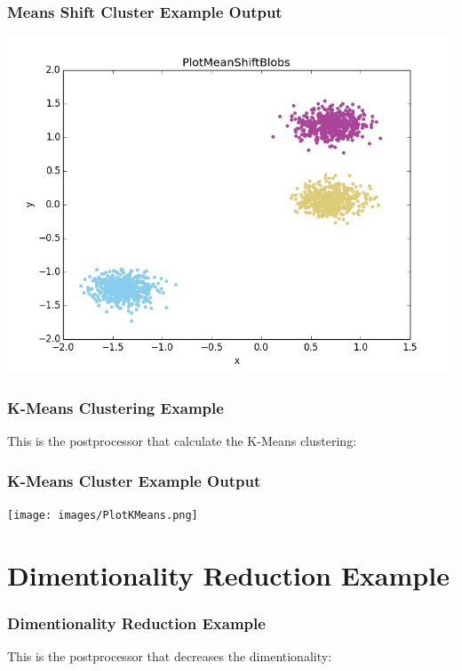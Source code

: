 \documentclass[t,9pt,svgnames]{beamer}
\begin{document}
\begin{frame}
  \frametitle{Means Shift Cluster Example Output}
  \includegraphics[width=\textwidth]{images/PlotMeanShift.png}
\end{frame}

\begin{frame}[fragile]
  \frametitle{K-Means Clustering Example}
  This is the postprocessor that calculate the K-Means clustering:
  
\end{frame}

\begin{frame}
  \frametitle{K-Means Cluster Example Output}
  \texttt{[image: images/PlotKMeans.png]}
\end{frame}

\section{Dimentionality Reduction Example}

\begin{frame}[fragile]
  \frametitle{Dimentionality Reduction Example}
  This is the postprocessor that decreases the dimentionality:
  
\end{frame}
\end{document}
